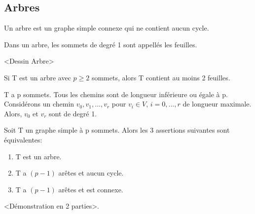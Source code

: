 \subsection{Arbres}

\begin{defn}
Un arbre est un graphe simple connexe qui ne contient aucun cycle.\\
\end{defn}

\begin{defn}
Dans un arbre, les sommets de degré 1 sont appellés les feuilles.\\
\end{defn}

\begin{exmp}
<Dessin Arbre>
\end{exmp}

\begin{prop}
Si T est un arbre avec $p\geq2$ sommets, alors T contient au moins 2 feuilles.
\end{prop}

\begin{demo}
T a p sommets. Tous les chemins sont de longueur inférieure ou égale à p. Considérons un chemin $v_{0},v_{1},...,v_{r}$ pour $v_{i} \in V$, $i=0,...,r$ de longueur maximale. Alors, $v_{0}$ et $v_{r}$ sont de degré 1.\\
\end{demo}

\begin{thrm}
Soit T un graphe simple à p sommets. Alors les 3 assertions suivantes sont équivalentes:
	\begin{enumerate}
	\item T est un arbre.
	\item T a $(p-1)$ arêtes et aucun cycle.
	\item T a $(p-1)$ arêtes et est connexe.
	\end{enumerate}
\end{thrm}

\begin{demo}
<Démonstration en 2 parties>.
\end{demo}